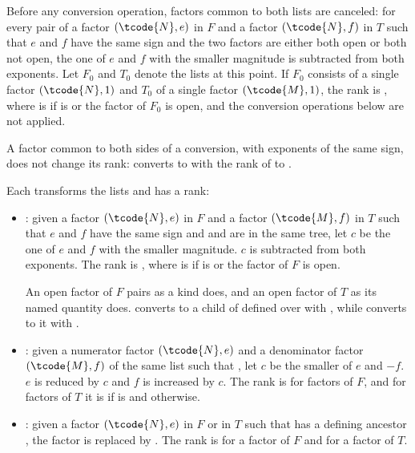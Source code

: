 \pnum
Before any conversion operation, factors common to both lists are canceled:
for every pair of a factor $(\tcode{N}, e)$ in $F$ and a factor $(\tcode{N}, f)$ in $T$
such that $e$ and $f$ have the same sign and the two factors are either both open or both not open,
the one of $e$ and $f$ with the smaller magnitude is subtracted from both exponents.
Let $F_0$ and $T_0$ denote the lists at this point.
If $F_0$ consists of a single factor $(\tcode{N}, 1)$ and $T_0$ of a single factor $(\tcode{M}, 1)$,
the rank is ,
where  is  if  is  or the factor of $F_0$ is open,
and the conversion operations below are not applied.
\begin{note}
A factor common to both sides of a conversion, with exponents of the same sign, does not change its rank:
 converts to 
with the rank of  to .
\end{note}

\pnum
Each  transforms the lists and has a rank:
\begin{itemize}
\item
{}: given a factor $(\tcode{N}, e)$ in $F$ and
a factor $(\tcode{M}, f)$ in $T$ such that $e$ and $f$ have the same sign and
 and  are in the same tree,
let $c$ be the one of $e$ and $f$ with the smaller magnitude.
$c$ is subtracted from both exponents.
The rank is ,
where  is  if  is  or the factor of $F$ is open.
\begin{note}
An open factor of $F$ pairs as a kind does, and an open factor of $T$ as its named quantity does.
 converts to a child of 
defined over  with , while
 converts to it with .
\end{note}
\item
{}: given a numerator factor $(\tcode{N}, e)$ and
a denominator factor $(\tcode{M}, f)$ of the same list such that
,
let $c$ be the smaller of $e$ and $-f$.
$e$ is reduced by $c$ and $f$ is increased by $c$.
The rank is  for factors of $F$, and for factors of $T$ it is 
if  is  and  otherwise.
\item
{}: given a factor $(\tcode{N}, e)$ in $F$ or in $T$
such that  has a defining ancestor ,
the factor is replaced by .
The rank is  for a factor of $F$ and
 for a factor of $T$.
\end{itemize}

